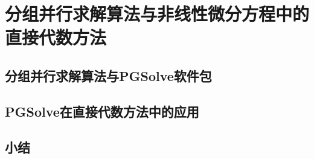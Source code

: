\chapter{分组并行求解算法与非线性微分方程中的直接代数方法}
\section{分组并行求解算法与PGSolve软件包}
\section{PGSolve在直接代数方法中的应用}
\section{小结}
